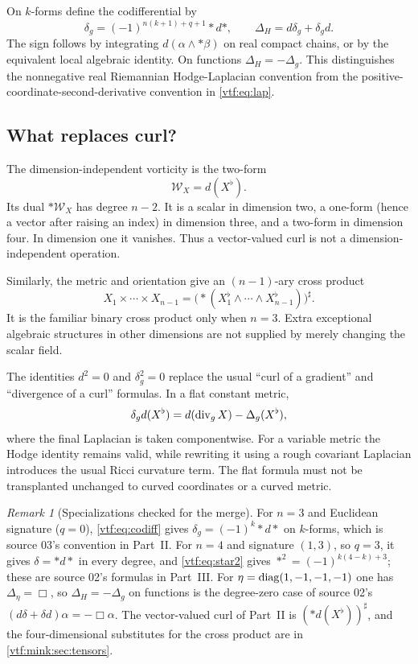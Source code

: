 \documentclass[11pt,letterpaper]{article}
\theoremstyle{definition}
\theoremstyle{remark}
\newtheorem{remark}[theorem]{Remark}
\begin{document}
On $k$-forms define the codifferential by
\begin{equation}\label{vtf:eq:codiff}
 \delta_g=(-1)^{n(k+1)+q+1}*d*,\qquad
 \Delta_H=d\delta_g+\delta_gd.
\end{equation}
The sign follows by integrating $d(\alpha\wedge*\beta)$ on real compact
chains, or by the equivalent local algebraic identity. On functions
$\Delta_H=-\Delta_g$. This distinguishes the nonnegative real Riemannian
Hodge-Laplacian convention from the positive-coordinate-second-derivative
convention in \eqref{vtf:eq:lap}.

\subsection{What replaces curl?}

The dimension-independent vorticity is the two-form
\[
 \mathcal W_X=d(X^\flat).
\]
Its dual $*\mathcal W_X$ has degree $n-2$. It is a scalar in dimension two,
a one-form (hence a vector after raising an index) in dimension three, and a
two-form in dimension four. In dimension one it vanishes. Thus a vector-valued
curl is not a dimension-independent operation.

Similarly, the metric and orientation give an $(n-1)$-ary cross product
\[
 X_1\times\cdots\times X_{n-1}
 =\bigl(*(X_1^\flat\wedge\cdots\wedge X_{n-1}^\flat)\bigr)^\sharp.
\]
It is the familiar binary cross product only when $n=3$. Extra exceptional
algebraic structures in other dimensions are not supplied by merely changing
the scalar field.

The identities $d^2=0$ and $\delta_g^2=0$ replace the usual ``curl of a
gradient'' and ``divergence of a curl'' formulas. In a flat constant metric,
\[
 \delta_gd(X^\flat)=d(\operatorname{div}_gX)-\Delta_g(X^\flat),
\]
where the final Laplacian is taken componentwise. For a variable metric the
Hodge identity remains valid, while rewriting it using a rough covariant
Laplacian introduces the usual Ricci curvature term. The flat formula must
not be transplanted unchanged to curved coordinates or a curved metric.

\begin{remark}[Specializations checked for the merge]\label{vtf:rem:specializations}
For $n=3$ and Euclidean signature ($q=0$), \eqref{vtf:eq:codiff} gives
$\delta_g=(-1)^k*d*$ on $k$-forms, which is source 03's convention in Part~II.
For $n=4$ and signature $(1,3)$, so $q=3$, it gives $\delta=*d*$ in every degree,
and \eqref{vtf:eq:star2} gives $*^2=(-1)^{k(4-k)+3}$; these are source 02's
formulas in Part~III. For $\eta=\operatorname{diag}(1,-1,-1,-1)$ one has $\Delta_\eta=\Box$,
so $\Delta_H=-\Delta_g$ on functions is the degree-zero case of source 02's
$(d\delta+\delta d)\alpha=-\Box\alpha$. The vector-valued curl of Part~II is
$(*d(X^\flat))^\sharp$, and the four-dimensional substitutes for the cross
product are in \cref{vtf:mink:sec:tensors}.
\end{remark}
\end{document}
